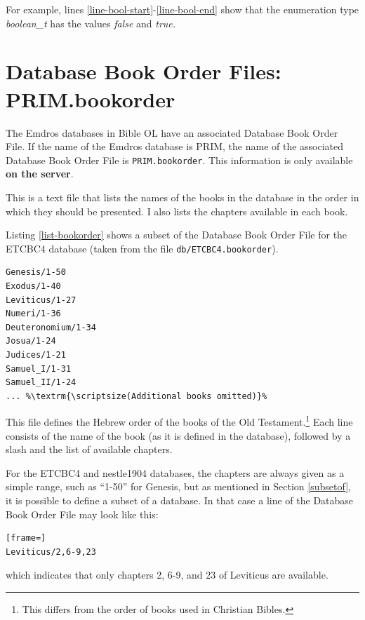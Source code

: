 \documentclass[11pt,oneside,a4paper]{memoir}
\begin{document}
For example, lines \ref{line-bool-start}-\ref{line-bool-end} show that the enumeration type
\emph{boolean\_t} has the values \emph{false} and \emph{true.}

\section{Database Book Order Files: PRIM.bookorder}\label{sec-bookorder}

The Emdros databases in Bible OL have an associated Database Book Order File. If the name of
the Emdros database is PRIM, the name of the associated Database Book Order File is
\texttt{PRIM.bookorder}. This information is only available \textbf{on the server}.

This is a text file that lists the names of the books in the database in the order in which they
should be presented. I also lists the chapters available in each book.

Listing \ref{list-bookorder} shows a subset of the Database Book Order File for the ETCBC4 database
(taken from the file \texttt{db/ETCBC4.bookorder}).

\begin{lstlisting}[caption=A subset of the ETCBC4 Book Order File,label=list-bookorder]
Genesis/1-50
Exodus/1-40
Leviticus/1-27
Numeri/1-36
Deuteronomium/1-34
Josua/1-24
Judices/1-21
Samuel_I/1-31
Samuel_II/1-24
... %\textrm{\scriptsize(Additional books omitted)}%
\end{lstlisting}

This file defines the Hebrew order of the books of the Old Testament.\footnote{This differs from the
  order of books used in Christian Bibles.} Each line consists of the name of the book (as it is
defined in the database), followed by a slash and the list of available chapters.

For the ETCBC4 and nestle1904 databases, the chapters are always given as a simple range, such as
``1-50'' for Genesis, but as mentioned in Section \ref{subsetof}, it is possible to define a
subset of a database. In that case a line of the Database Book Order File may look like this:

\begin{lstlisting}[frame=]
Leviticus/2,6-9,23
\end{lstlisting}

\noindent
which indicates that only chapters 2, 6-9, and 23 of Leviticus are available.
\end{document}
